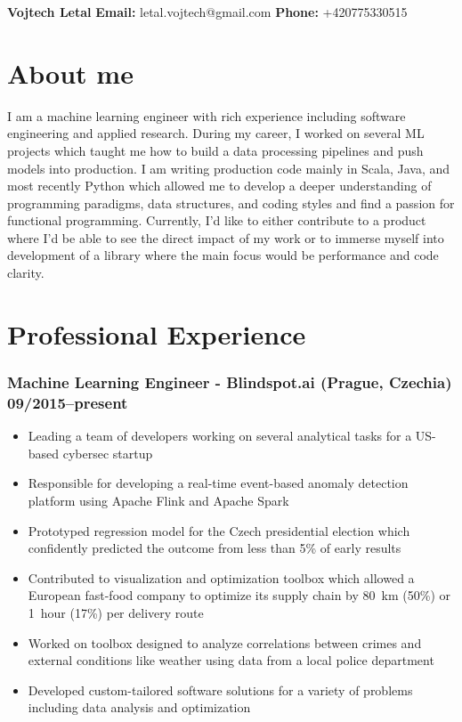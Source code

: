\documentclass[11pt]{article}
\date{}
\begin{document}
\clearpage
\thispagestyle{empty}
{\center\bfseries\huge Vojtech Letal}
\hfill
{\bf Email:} letal.vojtech@gmail.com
{\bf Phone:} +420775330515

\section*{About me}
I am a machine learning engineer with rich experience including software engineering and applied research.
During my career, I worked on several ML projects which taught me how to build a data processing pipelines and push models into production.
I am writing production code mainly in Scala, Java, and most recently Python which allowed me to develop a deeper understanding of programming paradigms, data structures, and coding styles and find a passion for functional programming.
Currently, I’d like to either contribute to a product where I’d be able to see the direct impact of my work or to immerse myself into development of a library where the main focus would be performance and code clarity.

\section*{Professional Experience}
\subsubsection*{\bf Machine Learning Engineer - Blindspot.ai (Prague, Czechia) \hfill 09/2015--present}
	 \begin{itemize}
		\setlength\itemsep{-0.25em}
		\item Leading a team of developers working on several analytical tasks for a US-based cybersec startup
		\item Responsible for developing a real-time event-based anomaly detection platform using Apache Flink and Apache Spark
		\item Prototyped regression model for the Czech presidential election which confidently predicted the outcome from less than 5\% of early results
		\item Contributed to visualization and optimization toolbox which allowed a European fast-food company to optimize its supply chain by 80~km (50\%) or 1~hour (17\%) per delivery route
		\item Worked on toolbox designed to analyze correlations between crimes and external conditions like weather using data from a local police department
		\item Developed custom-tailored software solutions for a variety of problems including data analysis and optimization
	 \end{itemize}
\end{document}
